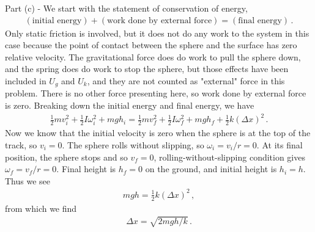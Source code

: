 \documentclass[11pt]{article}
\begin{document}
\noindent Part (c) - We start with the statement of conservation of energy,
\begin{align*}
(\text{initial energy})+ (\text{work done by external force}) = (\text{final energy})\,.
\end{align*} 
Only static friction is involved, but it does not do any work to the system in this case because the point of contact between the sphere and the surface has zero relative velocity. The gravitational force does do work to pull the sphere down, and the spring does do work to stop the sphere, but those effects have been included in $U_g$ and $U_k$, and they are not counted as "external" force in this problem. There is no other force presenting here, so work done by external force is zero. Breaking down the initial energy and final energy, we have
\begin{align*}
\frac{1}{2}mv_i^2 + \frac{1}{2}I\omega_i^2 + mgh_i =
\frac{1}{2}mv_f^2 + \frac{1}{2}I\omega_f^2 + mgh_f + \frac{1}{2}k(\Delta x)^2\,. 
\end{align*}
Now we know that the initial velocity is zero when the sphere is at the top of the track, so $v_i = 0$. The sphere rolls without slipping, so $\omega_i = v_i/r = 0$. At its final position, the sphere stops and so $v_f = 0$, rolling-without-slipping condition gives $\omega_f =v_f/r = 0$. Final height is $h_f = 0$ on the ground, and initial height is $h_i = h$. Thus we see
\begin{align*}
mgh = \frac{1}{2}k(\Delta x)^2\,,
\end{align*}
from which we find
\begin{align*}
\Delta x = \sqrt{2mgh/k}\,.
\end{align*}
\end{document}
